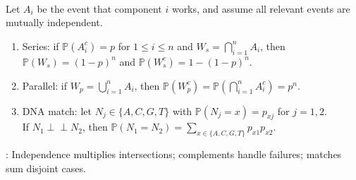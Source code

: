 \begin{example} \label{ex:reliability-and-match-probabilities} \\
Let $A_i$ be the event that component $i$ works, and assume all relevant events are mutually independent.
\begin{enumerate}[label=(\roman*)]
\setlength{\itemsep}{0pt}
\item Series: if $\mathbb{P}(A_i^c)=p$ for $1\leq i\leq n$ and $W_s=\bigcap\limits_{i=1}^{n}A_i$, then $\mathbb{P}(W_s)=(1-p)^n$ and $\mathbb{P}(W_s^c)=1-(1-p)^n$.
\item Parallel: if $W_p=\bigcup\limits_{i=1}^{n}A_i$, then $\mathbb{P}(W_p^c)=\mathbb{P}(\bigcap\limits_{i=1}^{n}A_i^c)=p^n$.
\item DNA match: let $N_j\in\{A,C,G,T\}$ with $\mathbb{P}(N_j=x)=p_{xj}$ for $j=1,2$.\\
If $N_1\perp\!\!\!\perp N_2$, then $\mathbb{P}(N_1=N_2)=\sum\limits_{x\in\{A,C,G,T\}}p_{x1}p_{x2}$.
\end{enumerate}
: Independence multiplies intersections; complements handle failures; matches sum disjoint cases.
\end{example}
